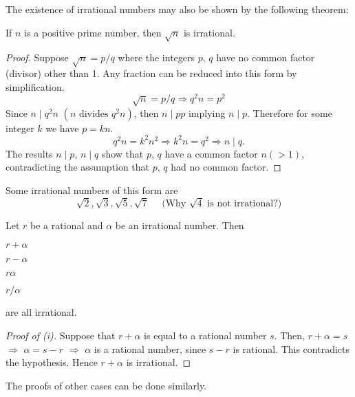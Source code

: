 \documentclass[11pt]{amsbook}
\begin{document}
The existence of irrational numbers may also be shown 
by the following theorem:
\begin{thm}
	If $n$ is a positive prime number, 
	then $\sqrt{n}$ is irrational.

	\begin{proof}
		Suppose $\sqrt{n} = p / q$ 
		where the integers $p$, $q$ have 
		no common factor (divisor) other than 1. 
		Any fraction can be reduced into this form by simplification.
		\[
			\sqrt{n} = p / q  
			\Longrightarrow 
			q^{2} n = p^{2}
		\]
		Since $n \mid q^{2} n$ $(n \text{ divides } q^{2}n)$, 
		then 
		$n \mid p p$ implying $n \mid p$. 
		Therefore for some integer $k$ 
		we have $p = k n$.
		\[
			q^{2} n = k^{2} n^{2} 
			\Longrightarrow 
			k^{2} n = q^{2} 
			\Longrightarrow 
			n \mid q.
		\]
		The results $n \mid p$, $n \mid q$ show that 
		$p$, $q$ have a common factor $n ( > 1 )$, 
		contradicting the assumption that 
		$p$, $q$ had no common factor.
	\end{proof}
\end{thm}


Some irrational numbers of this form are 
\[
	\sqrt{2}, 
	\sqrt{3}, 
	\sqrt{5}, 
	\sqrt{7}
	\quad 
	\text{ (Why $\sqrt{4}$ is not irrational?)}
\]

\begin{hProperty}
	Let $r$ be a rational and $\alpha$ be an irrational number.
	Then 
	\begin{hbColi}{4}
		\item $r + \alpha$
		\item $r - \alpha$
		\item $r \alpha$
		\item $r / \alpha$
	\end{hbColi}
	are all irrational.

	\begin{proof}[Proof of (i)]
		Suppose that $r + \alpha$ is equal to a rational number $s$.
		Then, 
		$r + \alpha = s$ 
		$\Longrightarrow$ 
		$\alpha = s - r$
		$\Longrightarrow$ 
		$\alpha$ 
		is a rational number, 
		since $s - r$ is rational. 
		This contradicts the hypothesis.
		Hence $r + \alpha$ is irrational.
	\end{proof}
	The proofs of other cases can be done similarly. \\
\end{hProperty}
\end{document}
